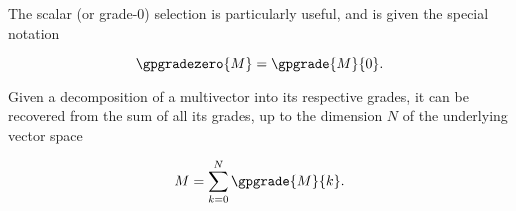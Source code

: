 The scalar (or grade-0) selection is particularly useful, and is given the special notation

\begin{dmath}\label{eqn:SimpleProducts:180}
\gpgradezero{M} = \gpgrade{M}{0}.
\end{dmath}

Given a decomposition of a multivector into its respective grades, it can be recovered from the sum of all its grades, up to the dimension \( N \) of the underlying vector space

\begin{dmath}\label{eqn:SimpleProducts:160}
   M = \sum_{k = 0}^N \gpgrade{M}{k}.
\end{dmath}
